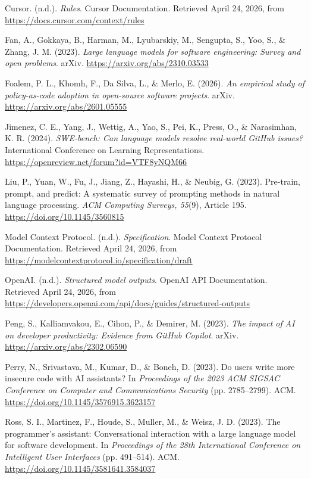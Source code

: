 \documentclass[11pt]{article}
\begin{document}
Cursor. (n.d.). \textit{Rules}. Cursor Documentation. Retrieved April 24, 2026,
from \url{https://docs.cursor.com/context/rules}

Fan, A., Gokkaya, B., Harman, M., Lyubarskiy, M., Sengupta, S., Yoo, S., \&
Zhang, J. M. (2023). \textit{Large language models for software engineering:
Survey and open problems}. arXiv. \url{https://arxiv.org/abs/2310.03533}

Foalem, P. L., Khomh, F., Da Silva, L., \& Merlo, E. (2026).
\textit{An empirical study of policy-as-code adoption in open-source software
projects}. arXiv. \url{https://arxiv.org/abs/2601.05555}

Jimenez, C. E., Yang, J., Wettig, A., Yao, S., Pei, K., Press, O., \&
Narasimhan, K. R. (2024). \textit{SWE-bench: Can language models resolve
real-world GitHub issues?} International Conference on Learning Representations.
\url{https://openreview.net/forum?id=VTF8yNQM66}

Liu, P., Yuan, W., Fu, J., Jiang, Z., Hayashi, H., \& Neubig, G. (2023).
Pre-train, prompt, and predict: A systematic survey of prompting methods in
natural language processing. \textit{ACM Computing Surveys, 55}(9), Article
195. \url{https://doi.org/10.1145/3560815}

Model Context Protocol. (n.d.). \textit{Specification}. Model Context Protocol
Documentation. Retrieved April 24, 2026, from
\url{https://modelcontextprotocol.io/specification/draft}

OpenAI. (n.d.). \textit{Structured model outputs}. OpenAI API Documentation.
Retrieved April 24, 2026, from
\url{https://developers.openai.com/api/docs/guides/structured-outputs}

Peng, S., Kalliamvakou, E., Cihon, P., \& Demirer, M. (2023). \textit{The
impact of AI on developer productivity: Evidence from GitHub Copilot}. arXiv.
\url{https://arxiv.org/abs/2302.06590}

Perry, N., Srivastava, M., Kumar, D., \& Boneh, D. (2023). Do users write more
insecure code with AI assistants? In \textit{Proceedings of the 2023 ACM SIGSAC
Conference on Computer and Communications Security} (pp. 2785--2799). ACM.
\url{https://doi.org/10.1145/3576915.3623157}

Ross, S. I., Martinez, F., Houde, S., Muller, M., \& Weisz, J. D. (2023). The
programmer's assistant: Conversational interaction with a large language model
for software development. In \textit{Proceedings of the 28th International
Conference on Intelligent User Interfaces} (pp. 491--514). ACM.
\url{https://doi.org/10.1145/3581641.3584037}
\end{document}
